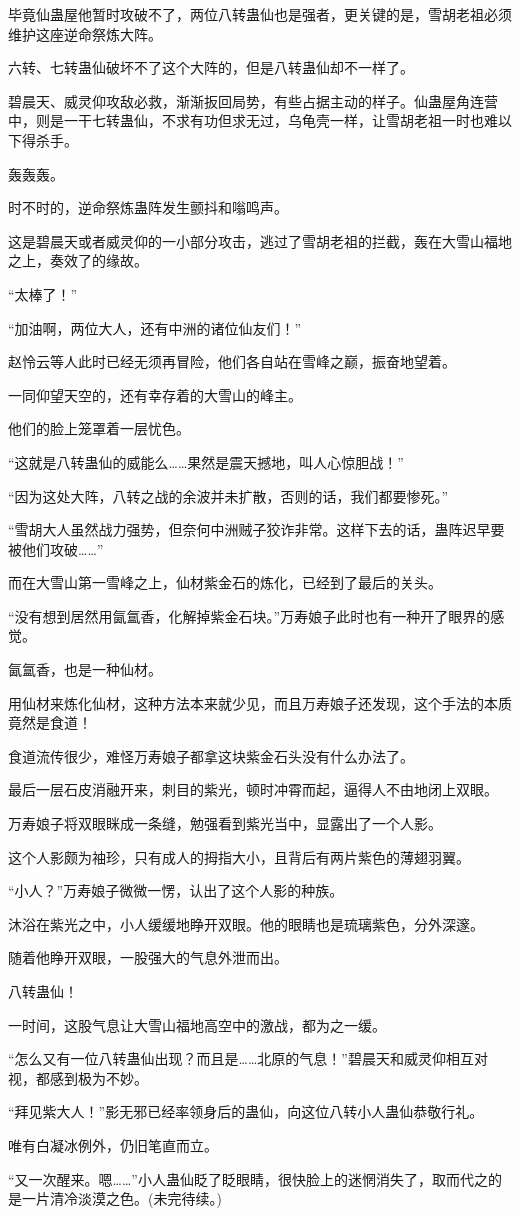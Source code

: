 \begin{this_body}
毕竟仙蛊屋他暂时攻破不了，两位八转蛊仙也是强者，更关键的是，雪胡老祖必须维护这座逆命祭炼大阵。

六转、七转蛊仙破坏不了这个大阵的，但是八转蛊仙却不一样了。

碧晨天、威灵仰攻敌必救，渐渐扳回局势，有些占据主动的样子。仙蛊屋角连营中，则是一干七转蛊仙，不求有功但求无过，乌龟壳一样，让雪胡老祖一时也难以下得杀手。

轰轰轰。

时不时的，逆命祭炼蛊阵发生颤抖和嗡鸣声。

这是碧晨天或者威灵仰的一小部分攻击，逃过了雪胡老祖的拦截，轰在大雪山福地之上，奏效了的缘故。

“太棒了！”

“加油啊，两位大人，还有中洲的诸位仙友们！”

赵怜云等人此时已经无须再冒险，他们各自站在雪峰之巅，振奋地望着。

一同仰望天空的，还有幸存着的大雪山的峰主。

他们的脸上笼罩着一层忧色。

“这就是八转蛊仙的威能么……果然是震天撼地，叫人心惊胆战！”

“因为这处大阵，八转之战的余波并未扩散，否则的话，我们都要惨死。”

“雪胡大人虽然战力强势，但奈何中洲贼子狡诈非常。这样下去的话，蛊阵迟早要被他们攻破……”

而在大雪山第一雪峰之上，仙材紫金石的炼化，已经到了最后的关头。

“没有想到居然用氤氲香，化解掉紫金石块。”万寿娘子此时也有一种开了眼界的感觉。

氤氲香，也是一种仙材。

用仙材来炼化仙材，这种方法本来就少见，而且万寿娘子还发现，这个手法的本质竟然是食道！

食道流传很少，难怪万寿娘子都拿这块紫金石头没有什么办法了。

最后一层石皮消融开来，刺目的紫光，顿时冲霄而起，逼得人不由地闭上双眼。

万寿娘子将双眼眯成一条缝，勉强看到紫光当中，显露出了一个人影。

这个人影颇为袖珍，只有成人的拇指大小，且背后有两片紫色的薄翅羽翼。

“小人？”万寿娘子微微一愣，认出了这个人影的种族。

沐浴在紫光之中，小人缓缓地睁开双眼。他的眼睛也是琉璃紫色，分外深邃。

随着他睁开双眼，一股强大的气息外泄而出。

八转蛊仙！

一时间，这股气息让大雪山福地高空中的激战，都为之一缓。

“怎么又有一位八转蛊仙出现？而且是……北原的气息！”碧晨天和威灵仰相互对视，都感到极为不妙。

“拜见紫大人！”影无邪已经率领身后的蛊仙，向这位八转小人蛊仙恭敬行礼。

唯有白凝冰例外，仍旧笔直而立。

“又一次醒来。嗯……”小人蛊仙眨了眨眼睛，很快脸上的迷惘消失了，取而代之的是一片清冷淡漠之色。(未完待续。)

\end{this_body}

